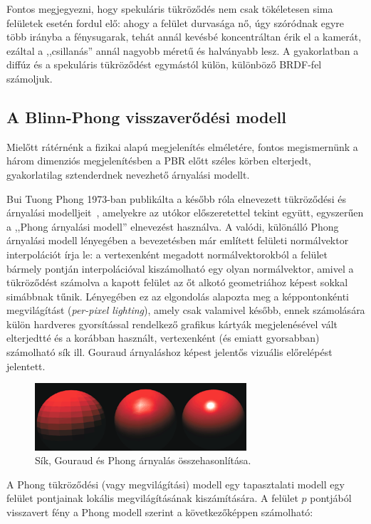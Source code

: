 Fontos megjegyezni, hogy spekuláris tükröződés nem csak tökéletesen sima felületek esetén fordul elő: ahogy a felület durvasága nő, úgy szóródnak egyre több irányba a fénysugarak, tehát annál kevésbé koncentráltan érik el a kamerát, ezáltal a ,,csillanás'' annál nagyobb méretű és halványabb lesz. A gyakorlatban a diffúz és a spekuláris tükröződést egymástól külön, különböző BRDF-fel számoljuk.

\subsection{A Blinn-Phong visszaverődési modell}

Mielőtt rátérnénk a fizikai alapú megjelenítés elméletére, fontos megismernünk a három dimenziós megjelenítésben a PBR előtt széles körben elterjedt, gyakorlatilag sztenderdnek nevezhető árnyalási modellt.

Bui Tuong Phong 1973-ban publikálta a később róla elnevezett tükröződési és árnyalási modelljeit~\cite{phong1975illumination}, amelyekre az utókor előszeretettel tekint együtt, egyszerűen a ,,Phong árnyalási modell'' elnevezést használva. A valódi, különálló Phong árnyalási modell lényegében a bevezetésben már említett felületi normálvektor interpolációt írja le: a vertexenként megadott normálvektorokból a felület bármely pontján interpolációval kiszámolható egy olyan normálvektor, amivel a tükröződést számolva a kapott felület az őt alkotó geometriához képest sokkal simábbnak tűnik. Lényegében ez az elgondolás alapozta meg a képpontonkénti megvilágítást (\textit{per-pixel lighting}), amely csak valamivel később, ennek számolására külön hardveres gyorsítással rendelkező grafikus kártyák megjelenésével vált elterjedtté és a korábban használt, vertexenként (és emiatt gyorsabban) számolható sík ill. Gouraud árnyaláshoz képest jelentős vizuális előrelépést jelentett.

\begin{figure}[!ht]
    \centering
    \includegraphics[width=0.7\textwidth]{images/flat_gouraud_phong.png}
    \caption{Sík, Gouraud és Phong árnyalás összehasonlítása. }
\end{figure}

A Phong tükröződési (vagy megvilágítási) modell egy tapasztalati modell egy felület pontjainak lokális megvilágításának kiszámítására. A felület \(p\) pontjából visszavert fény a Phong modell szerint a következőképpen számolható:

